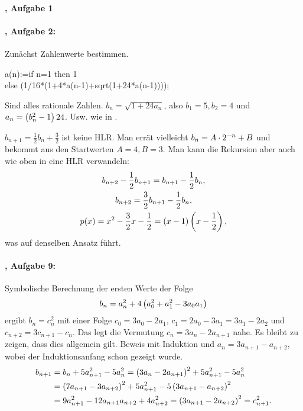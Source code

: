 \documentclass[11pt,a4paper]{article}
\begin{document}
\paragraph{\cite{S}, Aufgabe 1}

\paragraph{\cite{S}, Aufgabe 2:}
Zunächst Zahlenwerte bestimmen.
\begin{code}
  a(n):=if n=1 then 1\\
  else (1/16*(1+4*a(n-1)+sqrt(1+24*a(n-1)))); 
\end{code}
Sind alles rationale Zahlen.  $b_n=\sqrt{1+24a_n}$, also $b_1=5, b_2=4$ und
$a_n=\left(b_n^2-1\right){24}$. Usw. wie in \cite{S}.

$b_{n+1}=\frac12b_n+\frac32$ ist keine HLR.  Man errät vielleicht
$b_n=A\cdot2^{-n}+B$ und bekommt aus den Startwerten $A=4, B=3$.  Man kann die
Rekursion aber auch wie oben in eine HLR verwandeln:
\begin{gather*}
  b_{n+2}-\frac12 b_{n+1}=b_{n+1}-\frac12 b_n,\\
  b_{n+2}=\frac32 b_{n+1}-\frac12 b_n,\\
  p(x)=x^2-\frac32 x-\frac12=(x-1)\left(x-\frac12\right),
\end{gather*}
was auf denselben Ansatz führt. 

\paragraph{\cite{S}, Aufgabe 9:}
Symbolische Berechnung der ersten Werte der Folge
\begin{gather*}
  b_n=a_n^2+4\left(a_0^2+a_1^2-3a_0a_1\right)
\end{gather*}
ergibt $b_n=c_n^2$ mit einer Folge $c_0=3a_0-2a_1$, $c_1=2a_0-3a_1=3a_1-2a_2$
und $c_{n+2}=3c_{n+1}-c_n$.  Das legt die Vermutung $c_n=3a_n-2a_{n+1}$ nahe.
Es bleibt zu zeigen, dass dies allgemein gilt.  Beweis mit Induktion und
$a_n=3a_{n+1}-a_{n+2}$, wobei der Induktionsanfang schon gezeigt wurde.
\begin{align*}
  b_{n+1}&=b_n+5a_{n+1}^2-5a_n^2=\left(3a_n-2a_{n+1}\right)^2+5a_{n+1}^2-5a_n^2\\
  &=\left(7a_{n+1}-3a_{n+2}\right)^2+5a_{n+1}^2-5\left(3a_{n+1}-a_{n+2}\right)^2\\
  &=9a_{n+1}^2-12a_{n+1}a_{n+2}+4a_{n+2}^2=\left(3a_{n+1}-2a_{n+2}\right)^2=c_{n+1}^2.
\end{align*}
\end{document}
